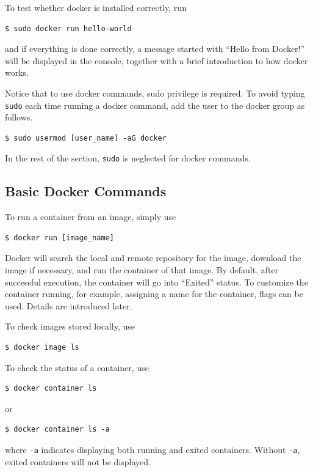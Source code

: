 To test whether docker is installed correctly, run 
\begin{lstlisting}
$ sudo docker run hello-world
\end{lstlisting}
and if everything is done correctly, a message started with ``Hello from Docker!'' will be displayed in the console, together with a brief introduction to how docker works.

Notice that to use docker commands, sudo privilege is required. To avoid typing \verb|sudo| each time running a docker command, add the user to the docker group as follows.
\begin{lstlisting}
$ sudo usermod [user_name] -aG docker
\end{lstlisting}

In the rest of the section, \verb|sudo| is neglected for docker commands.

\subsection{Basic Docker Commands}

To run a container from an image, simply use
\begin{lstlisting}
$ docker run [image_name]
\end{lstlisting}
Docker will search the local and remote repository for the image, download the image if necessary, and run the container of that image. By default, after successful execution, the container will go into ``Exited'' status. To customize the container running, for example, assigning a name for the container, flags can be used. Details are introduced later.

To check images stored locally, use
\begin{lstlisting}
$ docker image ls
\end{lstlisting}

To check the status of a container, use
\begin{lstlisting}
$ docker container ls
\end{lstlisting}
or 
\begin{lstlisting}
$ docker container ls -a
\end{lstlisting}
where \verb|-a| indicates displaying both running and exited containers. Without \verb|-a|, exited containers will not be displayed.

